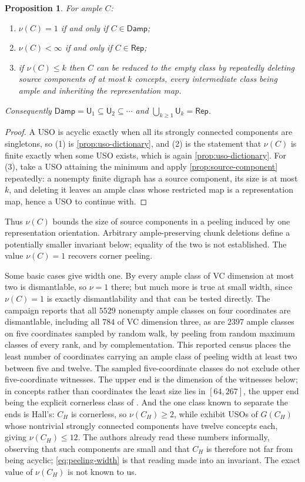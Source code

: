 \documentclass[11pt]{article}
\newtheorem{proposition}{Proposition}[section]
\theoremstyle{definition}
\newcommand{\Damp}{\mathsf{Damp}}
\newcommand{\Rep}{\mathsf{Rep}}
\begin{document}
\begin{proposition}\label{prop:peeling-width-ends}
For ample $C$:
\begin{enumerate}\setlength{\itemsep}{0pt}
\item $\nu(C)=1$ if and only if $C\in\Damp$;
\item $\nu(C)<\infty$ if and only if $C\in\Rep$;
\item if $\nu(C)\le k$ then $C$ can be reduced to the empty class by repeatedly
deleting source components of at most $k$ concepts, every intermediate class
being ample and inheriting the representation map.
\end{enumerate}
Consequently
$\Damp=\mathsf{U}_{1}\subseteq\mathsf{U}_{2}\subseteq\cdots$ and
$\bigcup_{k\ge1}\mathsf{U}_{k}=\Rep$.
\end{proposition}
\begin{proof}
A USO is acyclic exactly when all its strongly connected components are
singletons, so (1) is \cref{prop:uso-dictionary}, and (2) is the statement that
$\nu(C)$ is finite exactly when some USO exists, which is again
\cref{prop:uso-dictionary}. For (3), take a USO attaining the minimum and apply
\cref{prop:source-component} repeatedly: a nonempty finite digraph has a source
component, its size is at most $k$, and deleting it leaves an ample class whose
restricted map is a representation map, hence a USO to continue with.
\end{proof}

Thus $\nu(C)$ bounds the size of source components in a peeling induced
by one representation orientation. Arbitrary ample-preserving chunk
deletions define a potentially smaller invariant below; equality of the two
is not established. The value $\nu(C)=1$ recovers corner peeling.

Some basic cases give width one. By \cite[Proposition~4.11]{CCMW} every ample class of VC
dimension at most two is dismantlable, so $\nu=1$ there; but much more is true at
small width, since $\nu(C)=1$ is exactly dismantlability and that can be tested
directly. The campaign reports that all $5529$ nonempty ample classes on four coordinates are dismantlable,
including all $784$ of VC dimension three, as are $2397$ ample classes on five
coordinates sampled by random walk, by peeling from random maximum classes of
every rank, and by complementation. This reported census places the least number of coordinates carrying an
ample class of peeling width at least two between five and twelve. The
sampled five-coordinate classes do not exclude other five-coordinate witnesses. The upper end is the dimension of the witnesses below; in concepts rather than
coordinates the least size lies in $[64,267]$, the upper end being the explicit
cornerless class of \cite[Theorem~D]{AmpleCorners}. And the one class known to separate the ends is Hall's: $C_{H}$
is cornerless, so $\nu(C_{H})\ge2$, while \cite[Figs.~6 and~7]{CCMW} exhibit USOs
of $G(C_{H})$ whose nontrivial strongly connected components have twelve concepts
each, giving $\nu(C_{H})\le12$. The authors already read these numbers
informally, observing that such components are small and that $C_{H}$ is
therefore not far from being acyclic; \eqref{eq:peeling-width} is that reading
made into an invariant. The exact value of $\nu(C_{H})$ is not known to us.
\end{document}
